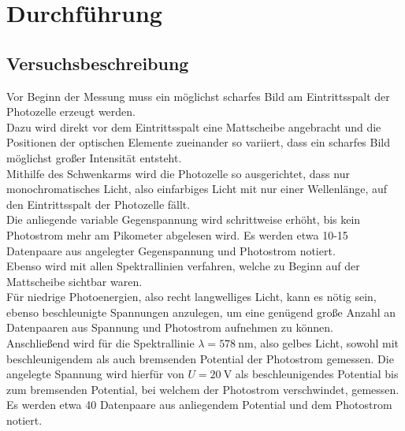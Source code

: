\section{Durchführung}
\label{sec:Durchführung}



\subsection{Versuchsbeschreibung}
\label{sec:Versuchsbeschreibung}
Vor Beginn der Messung muss ein möglichst scharfes Bild am Eintrittsspalt der Photozelle erzeugt werden.\\
Dazu wird direkt vor dem Eintrittsspalt eine Mattscheibe angebracht und die Positionen der optischen Elemente zueinander so variiert, dass ein scharfes Bild möglichst großer Intensität entsteht.\\
Mithilfe des Schwenkarms wird die Photozelle so ausgerichtet, dass nur monochromatisches Licht, also einfarbiges Licht mit nur einer Wellenlänge, auf den Eintrittsspalt der Photozelle fällt.\\
Die anliegende variable Gegenspannung wird schrittweise erhöht, bis kein Photostrom mehr am Pikometer abgelesen wird. Es werden etwa 10-15 Datenpaare aus angelegter Gegenspannung und Photostrom notiert.\\
Ebenso wird mit allen Spektrallinien verfahren, welche zu Beginn auf der Mattscheibe sichtbar waren.\\
Für niedrige Photoenergien, also recht langwelliges Licht, kann es nötig sein, ebenso beschleunigte Spannungen anzulegen, um eine genügend große Anzahl an Datenpaaren aus Spannung und Photostrom aufnehmen zu können.\\
Anschließend wird für die Spektrallinie $\lambda=\SI{578}{\nano\meter}$, also gelbes Licht, sowohl mit beschleunigendem als auch bremsenden Potential der Photostrom gemessen.
Die angelegte Spannung wird hierfür von $U=\SI{+20}{\volt}$ als beschleunigendes Potential bis zum bremsenden Potential, bei welchem der Photostrom verschwindet, gemessen.
Es werden etwa 40 Datenpaare aus anliegendem Potential und dem Photostrom notiert.
